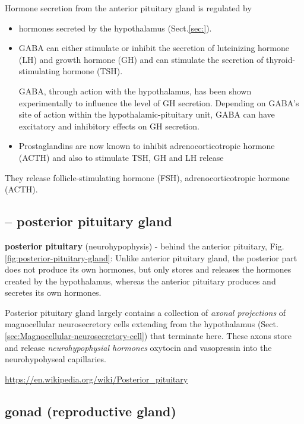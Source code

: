 Hormone secretion from the anterior pituitary gland is regulated by 
\begin{itemize}
  \item  hormones secreted by the hypothalamus (Sect.\ref{sec:}). 

  \item  GABA can either stimulate or inhibit the secretion of luteinizing
  hormone (LH) and growth hormone (GH) and can stimulate the secretion of
  thyroid-stimulating hormone (TSH). 
  
  GABA, through action with the hypothalamus, has been shown experimentally to
  influence the level of GH secretion.
  Depending on GABA's site of action within the hypothalamic-pituitary unit,
  GABA can have  excitatory and inhibitory effects on GH secretion.
  
  \item Prostaglandins are now known to inhibit adrenocorticotropic hormone
  (ACTH) and also to stimulate TSH, GH and LH release
\end{itemize}
  
They release  follicle-stimulating hormone (FSH), adrenocorticotropic hormone
(ACTH).

\subsection{-- posterior pituitary gland}
\label{sec:posterior-pituitary-gland}

{\bf posterior pituitary} (neurohypophysis) - behind the anterior pituitary,
Fig.\ref{fig:posterior-pituitary-gland}:
Unlike anterior pituitary gland, the posterior part  does not produce its own
hormones, but only stores and releases the hormones created by the hypothalamus,
whereas the anterior pituitary produces and secretes its own hormones.

Posterior pituitary gland largely contains a collection of {\it axonal
projections} of magnocellular neurosecretory cells extending from the hypothalamus
(Sect.\ref{sec:Magnocellular-neurosecretory-cell}) that terminate here.
These axons store and release {\it neurohypophysial hormones} oxytocin and
vasopressin into the neurohypohyseal capillaries.
  
\url{https://en.wikipedia.org/wiki/Posterior_pituitary}

\subsection{gonad (reproductive gland)}
\label{sec:gonad}

